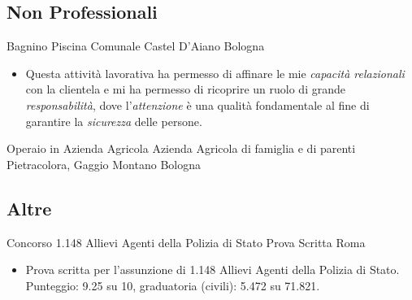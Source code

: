 \subsection{Non Professionali}

{Bagnino}
{Piscina Comunale}
{Castel D'Aiano}
{Bologna}
{\begin{itemize}
	\item Questa attività lavorativa ha permesso di affinare le mie
	\textit{capacità relazionali} con la clientela e mi ha permesso di ricoprire
	un ruolo di grande \textit{responsabilità}, dove l'\textit{attenzione} è una
	qualità fondamentale al fine di garantire la \textit{sicurezza} delle
	persone.
\end{itemize}}

{Operaio in Azienda Agricola}
{Azienda Agricola di famiglia e di parenti}
{Pietracolora, Gaggio Montano}
{Bologna}
{}



\subsection{Altre}

{Concorso 1.148 Allievi Agenti della Polizia di Stato}
{Prova Scritta}
{Roma}
{}
{\begin{itemize}
	\item Prova scritta per l'assunzione di 1.148 Allievi Agenti della Polizia
	di Stato. Punteggio: 9.25 su 10, graduatoria (civili): 5.472 su 71.821.
\end{itemize}}
